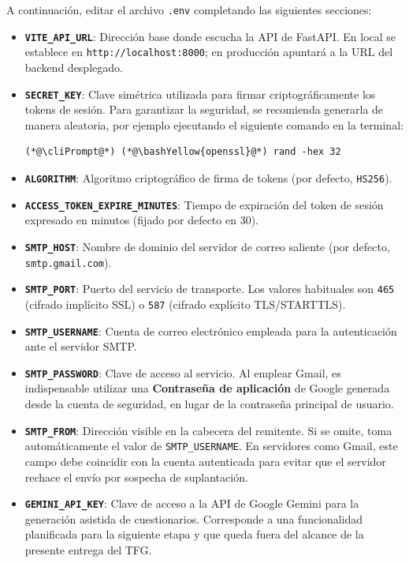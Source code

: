 \begin{appendices}
A continuación, editar el archivo \texttt{.env} completando las siguientes secciones:

\begin{itemize}
    \item \textbf{\texttt{VITE\_API\_URL}}: Dirección base donde escucha la API de FastAPI. En local se establece en \texttt{http://localhost:8000}; en producción apuntará a la URL del backend desplegado.
    \item \textbf{\texttt{SECRET\_KEY}}: Clave simétrica utilizada para firmar criptográficamente los tokens de sesión. Para garantizar la seguridad, se recomienda generarla de manera aleatoria, por ejemplo ejecutando el siguiente comando en la terminal:
\begin{lstlisting}
(*@\cliPrompt@*) (*@\bashYellow{openssl}@*) rand -hex 32
\end{lstlisting}
    \item \textbf{\texttt{ALGORITHM}}: Algoritmo criptográfico de firma de tokens (por defecto, \texttt{HS256}).
    \item \textbf{\texttt{ACCESS\_TOKEN\_EXPIRE\_MINUTES}}: Tiempo de expiración del token de sesión expresado en minutos (fijado por defecto en 30).
    \item \textbf{\texttt{SMTP\_HOST}}: Nombre de dominio del servidor de correo saliente (por defecto, \texttt{smtp.gmail.com}).
    \item \textbf{\texttt{SMTP\_PORT}}: Puerto del servicio de transporte. Los valores habituales son \texttt{465} (cifrado implícito SSL) o \texttt{587} (cifrado explícito TLS/STARTTLS).
    \item \textbf{\texttt{SMTP\_USERNAME}}: Cuenta de correo electrónico empleada para la autenticación ante el servidor SMTP.
    \item \textbf{\texttt{SMTP\_PASSWORD}}: Clave de acceso al servicio. Al emplear Gmail, es indispensable utilizar una \textbf{Contraseña de aplicación} de Google generada desde la cuenta de seguridad, en lugar de la contraseña principal de usuario.
    \item \textbf{\texttt{SMTP\_FROM}}: Dirección visible en la cabecera del remitente. Si se omite, toma automáticamente el valor de \texttt{SMTP\_USERNAME}. En servidores como Gmail, este campo debe coincidir con la cuenta autenticada para evitar que el servidor rechace el envío por sospecha de suplantación.
    \item \textbf{\texttt{GEMINI\_API\_KEY}}: Clave de acceso a la API de Google Gemini para la generación asistida de cuestionarios. Corresponde a una funcionalidad planificada para la siguiente etapa y que queda fuera del alcance de la presente entrega del TFG.
\end{itemize}


\end{appendices}
